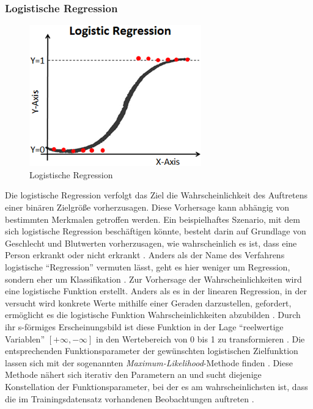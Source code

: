 \subsubsection{Logistische Regression}
\begin{figure}
    \centering
    \includegraphics[scale=0.9]{pic/MA-Bilder/logistische-Regression.png}
    \caption{Logistische Regression \cite{Ng.2018}}
    \label{Fig:logistic regression}
\end{figure}
Die logistische Regression verfolgt das Ziel die Wahrscheinlichkeit des Auftretens einer binären Zielgröße vorherzusagen. Diese Vorhersage kann abhängig von bestimmten Merkmalen getroffen werden. Ein beispielhaftes Szenario, mit dem sich logistische Regression beschäftigen könnte, besteht darin auf Grundlage von Geschlecht und Blutwerten vorherzusagen, wie wahrscheinlich es ist, dass eine Person erkrankt oder nicht erkrankt \cite{Kalisch.2021}. Anders als der Name des Verfahrens logistische \enquote{Regression} vermuten lässt, geht es hier weniger um Regression, sondern eher um Klassifikation \cite{Kersting.2019}. Zur Vorhersage der Wahrscheinlichkeiten wird eine logistische Funktion erstellt. Anders als es in der linearen Regression, in der versucht wird konkrete Werte mithilfe einer Geraden darzustellen, gefordert, ermöglicht es die logistische Funktion Wahrscheinlichkeiten abzubilden \cite{Behnke.2015}. Durch ihr s-förmiges Erscheinungsbild ist diese Funktion in der Lage \enquote{reelwertige Variablen} $[+\infty, -\infty]$ in den Wertebereich von 0 bis 1 zu transformieren \cite{Backhaus.2016}. Die entsprechenden Funktionsparameter der gewünschten logistischen Zielfunktion lassen sich mit der sogenannten \emph{Maximum-Likelihood}-Methode finden \cite{Backhaus.2016}. Diese Methode nähert sich iterativ den Parametern an und sucht diejenige Konstellation der Funktionsparameter, bei der es am wahrscheinlichsten ist, dass die im Trainingsdatensatz vorhandenen Beobachtungen auftreten \cite{Behnke.2015}.

